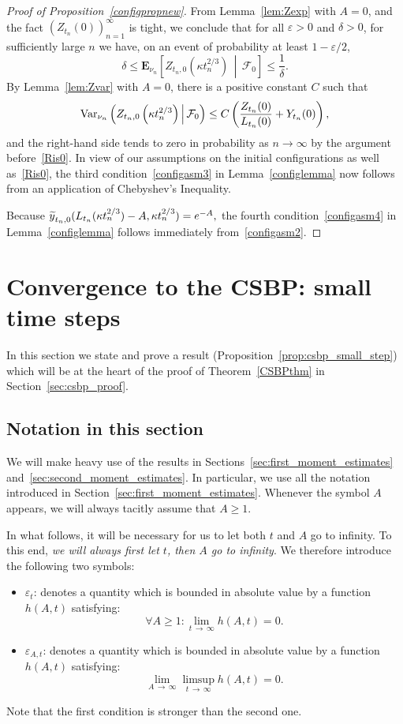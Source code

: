 \documentclass[AHL,Unicode,longabstracts,published]{cedram}
\newcommand*\eps{\varepsilon}
\newcommand*\Var{\textup{Var}}
\newcommand*\E{\mathbf{E}}
\newcommand\F{\mathcal{F}}
\newcommand{\1} {\mathds{1}}
\renewcommand*\to{\rightarrow}
\let\oldtilde\tilde
\renewcommand*{\tilde}[1]{\mathchoice{\widetilde{#1}}{\widetilde{#1}}{\oldtilde{#1}}{\oldtilde{#1}}}
\let\oldforall\forall
\renewcommand*{\forall}{\mathrel{\oldforall}}
\begin{document}
\begin{proof}[Proof of Proposition~\ref{configpropnew}]
From Lemma~\ref{lem:Zexp} with $A = 0$, and the fact $(Z_{t_n}(0))_{n=1}^{\infty}$ is tight, we conclude that for all $\eps > 0$ and $\delta > 0$, for sufficiently large $n$ we have, on an event of probability at least $1 - \eps/2$,
\[
\delta \leq \E_{\nu_n}\left[Z_{t_n,0}\left(\kappa t_n^{2/3}\right)\,\middle|\,\F_0\right] \leq \frac{1}{\delta}.
\]
By Lemma~\ref{lem:Zvar} with $A = 0$, there is a positive constant $C$ such that
\[
\Var_{\nu_n}\left(Z_{t_n,0}\left(\kappa t_n^{2/3}\right)\,\middle|\,\F_0\right) \leq C \left(\frac{Z_{t_n}(0)}{L_{t_n}(0)} + Y_{t_n}(0) \right),
\]
and the right-hand side tends to zero in probability as $n \rightarrow \infty$ by the argument before~\eqref{Ris0}. In view of our assumptions on the initial configurations as well as~\eqref{Ris0}, the third condition~\eqref{configasm3} in Lemma~\ref{configlemma} now follows from an application of Chebyshev's Inequality.

Because ${\tilde y}_{t_n,0}(L_{t_n}(\kappa t_n^{2/3}) - A, \kappa t_n^{2/3}) = e^{-A},$ the fourth condition~\eqref{configasm4} in Lemma~\ref{configlemma} follows immediately from~\eqref{configasm2}.
\end{proof}

\section{Convergence to the CSBP: small time steps}\label{CSBPsec}

In this section we state and prove a result (Proposition~\ref{prop:csbp_small_step}) which will be at the heart of the proof of Theorem~\ref{CSBPthm} in Section~\ref{sec:csbp_proof}.

\subsection{Notation in this section}

We will make heavy use of the results in Sections~\ref{sec:first_moment_estimates} and~\ref{sec:second_moment_estimates}. In particular, we use all the notation introduced in Section~\ref{sec:first_moment_estimates}. Whenever the symbol $A$ appears, we will always tacitly assume that $A\ge1$.

In what follows, it will be necessary for us to let both $t$ and $A$ go to infinity. To this end, \emph{we will always first let $t$, then $A$ go to infinity}. We therefore introduce the following two symbols:
\begin{itemize}
\item $\eps_t$: denotes a quantity which is bounded in absolute value by a function $h(A,t)$ satisfying:
\[
\forall A\ge 1: \lim_{t\,\to\,\infty} h(A,t) = 0.
\]
\item $\eps_{A,t}$: denotes a quantity which is bounded in absolute value by a function $h(A,t)$ satisfying:
\[
\lim_{A\,\to\,\infty} \limsup_{t\,\to\,\infty} h(A,t) = 0.
\]
\end{itemize}
Note that the first condition is stronger than the second one.
\end{document}
